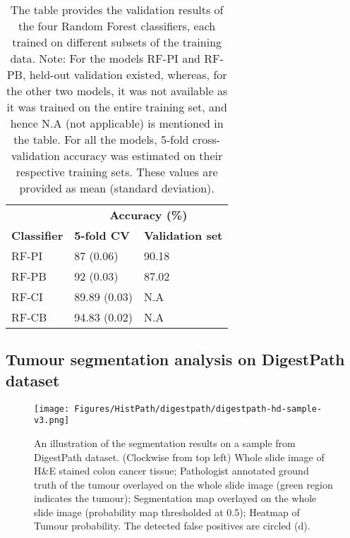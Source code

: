 \documentclass[times,twocolumn,final,authoryear]{tmp}
\begin{document}
\begin{table}
\centering
\caption{The table provides the validation results of the four Random Forest classifiers, each trained on different subsets of the training data. Note: For the models RF-PI and RF-PB, held-out validation existed, whereas, for the other two models, it was not available as it was trained on the entire training set, and hence N.A (not applicable) is mentioned in the table. For all the models, 5-fold cross-validation accuracy was estimated on their respective training sets. These values are provided as mean (standard deviation).}
\label{path_tab:RF-val_study}
\begin{tabular}{@{}lll@{}}
  
                    & \multicolumn{2}{c}{\textbf{Accuracy (\%)}}   \\    
\textbf{Classifier} & \textbf{5-fold CV} & \textbf{Validation set} \\
RF-PI               & 87 (0.06)          & 90.18                   \\
RF-PB               & 92 (0.03)          & 87.02                   \\
RF-CI               & 89.89 (0.03)       & N.A                     \\
RF-CB               & 94.83 (0.02)       & N.A                     \\  
\end{tabular}\end{table}




\subsection{Tumour segmentation analysis on DigestPath dataset}
 
\begin{figure}
    \texttt{[image: Figures/HistPath/digestpath/digestpath-hd-sample-v3.png]}
    \centering
    \caption{An illustration of the segmentation results on a sample from DigestPath dataset. (Clockwise from top left) Whole slide image of H\&E stained colon cancer tissue; Pathologist annotated ground truth of the tumour overlayed on the whole slide image (green region indicates the tumour); Segmentation map overlayed on the whole slide image (probability map thresholded at 0.5); Heatmap of Tumour probability. The detected false positives are circled (d).}
    \label{path_fig:digestpath_hd}
\end{figure}
\end{document}
